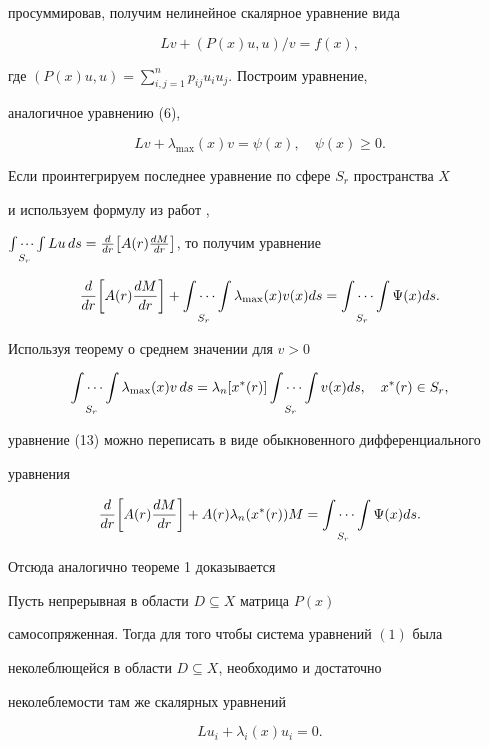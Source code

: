 просуммировав, получим нелинейное скалярное уравнение вида 


$$ 


L v+(P(x)u,u)/v=f(x), 


$$ 


где $(P(x)u,u)=\sum\limits^n_{i,j=1}p_{ij}u_i u_j$. Построим уравнение, 


аналогичное уравнению (6),


$$ 


L v+\lambda_{\max}(x)v=\psi(x),\quad \psi(x)\ge0. 


$$ 


Если проинтегрируем последнее уравнение по сфере $S_r$ пространства $X$ 


и используем формулу из работ \cite{5}, \cite{6} 


$\idotsint\limits_{S_r}L u\,ds=\frac{d}{dr}\big[A(r) 


\frac{dM}{dr}\big]$, то получим уравнение 


\begin{equation} 


\frac{d}{dr}\bigg[A(r)\frac{dM}{dr}\bigg]+ 


\idotsint\limits_{S_r}\lambda_{\max}(x)v(x)ds= 


\idotsint\limits_{S_r}\Psi(x)ds. 


\end{equation} 


Используя теорему о среднем значении для $v>0$ 


$$ 


\idotsint\limits_{S_r}\lambda_{\max}(x)v\,ds= 


\lambda_n[x^*(r)]\idotsint\limits_{S_r}v(x)ds, 


\quad x^*(r)\in S_r, 


$$ 


уравнение (13) можно переписать в виде обыкновенного дифференциального 


уравнения 


$$ 


\frac{d}{dr}\bigg[A(r)\frac{dM}{dr}\bigg]+A(r) 


\lambda_n(x^*(r))M=\idotsint\limits_{S_r} 


\Psi(x)ds. 


$$ 


Отсюда аналогично теореме 1 доказывается 


 


\begin{thm} 


Пусть непрерывная в области $D\subseteq X$ матрица $P(x)$ 


самосопряженная. Тогда для того чтобы система уравнений $(1)$ была 


неколеблющейся в области $D\subseteq X$, необходимо и достаточно 


неколеблемости там же скалярных уравнений 


$$ 


L u_i+\lambda_i(x)u_i=0. 


$$ 


\end{thm} 


